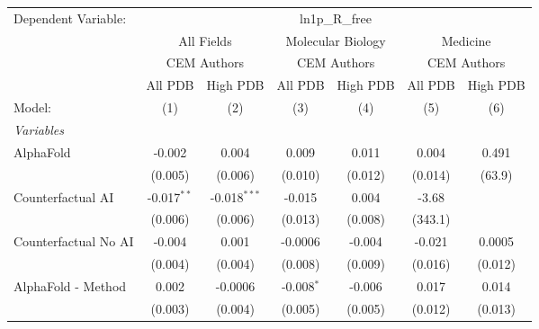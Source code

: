 \begingroup
\centering
\begin{tabular}{lcccccc}
   \tabularnewline \midrule \midrule
   Dependent Variable: & \multicolumn{6}{c}{ln1p\_R\_free}\\
 & \multicolumn{2}{c}{All Fields} & \multicolumn{2}{c}{Molecular Biology} & \multicolumn{2}{c}{Medicine} \\
\cmidrule(lr){2-3} \cmidrule(lr){4-5} \cmidrule(lr){6-7}
 & \multicolumn{2}{c}{CEM Authors} & \multicolumn{2}{c}{CEM Authors} & \multicolumn{2}{c}{CEM Authors} \\
\cmidrule(lr){2-3} \cmidrule(lr){4-5} \cmidrule(lr){6-7}
 & \multicolumn{1}{c}{All PDB} & \multicolumn{1}{c}{High PDB} & \multicolumn{1}{c}{All PDB} & \multicolumn{1}{c}{High PDB} & \multicolumn{1}{c}{All PDB} & \multicolumn{1}{c}{High PDB} \\
\cmidrule(lr){2-2} \cmidrule(lr){3-3} \cmidrule(lr){4-4} \cmidrule(lr){5-5} \cmidrule(lr){6-6} \cmidrule(lr){7-7}
   Model:                                                     & (1)           & (2)            & (3)          & (4)     & (5)     & (6)\\  
   \midrule
   \emph{Variables}\\
   AlphaFold                                                  & -0.002        & 0.004          & 0.009        & 0.011   & 0.004   & 0.491\\   
                                                              & (0.005)       & (0.006)        & (0.010)      & (0.012) & (0.014) & (63.9)\\   
   Counterfactual AI                                          & -0.017$^{**}$ & -0.018$^{***}$ & -0.015       & 0.004   & -3.68   &   \\   
                                                              & (0.006)       & (0.006)        & (0.013)      & (0.008) & (343.1) &   \\   
   Counterfactual No AI                                       & -0.004        & 0.001          & -0.0006      & -0.004  & -0.021  & 0.0005\\   
                                                              & (0.004)       & (0.004)        & (0.008)      & (0.009) & (0.016) & (0.012)\\   
   AlphaFold - Method                                         & 0.002         & -0.0006        & -0.008$^{*}$ & -0.006  & 0.017   & 0.014\\   
                                                              & (0.003)       & (0.004)        & (0.005)      & (0.005) & (0.012) & (0.013)\\   

\end{tabular}
